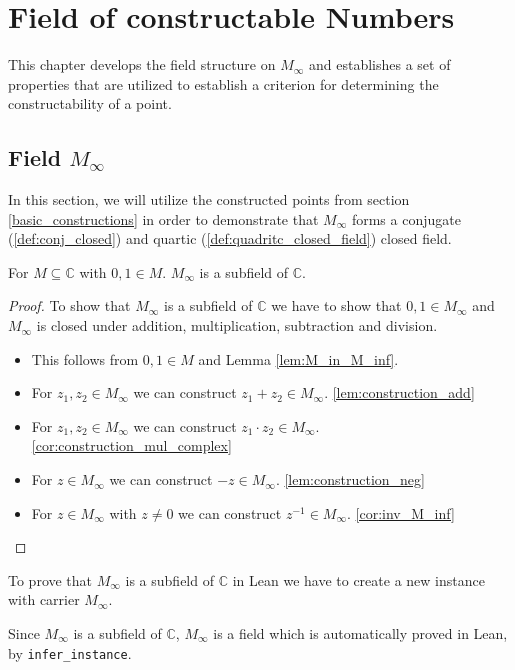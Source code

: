 \chapter{Field of constructable Numbers}
This chapter develops the field structure on $M_{\infty}$ and establishes a set of properties that are utilized to establish a criterion for determining the constructability of a point.
\section[Filed of Constructable Numbers]{Field $M_{\infty}$}
In this section, we will utilize the constructed points from section \ref{basic_constructions} in order to demonstrate that $M_{\infty}$ forms a conjugate (\ref{def:conj_closed}) and quartic (\ref{def:quadritc_closed_field}) closed field.

\begin{theorem}
    \label{thm:MField}
    \leanok
    For $M\subseteq \mathbb{C}$ with $0,1 \in M$. $M_{\infty}$ is a subfield of $\mathbb{C}$.
\end{theorem}
\begin{proof}
    \leanok
    To show that $M_{\infty}$ is a subfield of $\mathbb{C}$ we have to show that $0,1\in M_{\infty}$ and $M_{\infty}$ is closed under addition, multiplication, subtraction and division.
    \begin{itemize}
        \item [$0,1$:] This follows from $0,1 \in M$ and Lemma \ref{lem:M_in_M_inf}.
        \item [$+$:] For $z_1,z_2 \in M_{\infty}$ we can construct $z_1 + z_2 \in M_{\infty}$. \ref{lem:construction_add}
        \item [$*$:] For $z_1,z_2 \in M_{\infty}$ we can construct $z_1 \cdot z_2 \in M_{\infty}$. \ref{cor:construction_mul_complex}
        \item [$-$:] For $z \in M_{\infty}$ we can construct $-z \in M_{\infty}$. \ref{lem:construction_neg}
        \item [$^{-1}$:] For $z \in M_{\infty}$ with $z \ne 0$ we can construct $z^{-1} \in M_{\infty}$. \ref{cor:inv_M_inf}
    \end{itemize}
\end{proof}

\begin{remark}
   To prove that $M_{\infty}$ is a subfield of $\mathbb{C}$ in Lean we have to create a new instance with carrier $M_{\infty}$.
\end{remark}
\begin{remark}
    \label{rem:MField_Field}
    Since $M_{\infty}$ is a subfield of $\mathbb{C}$, $M_{\infty}$ is a field which is automatically proved in Lean, by \lstinline{infer_instance}.
\end{remark}


